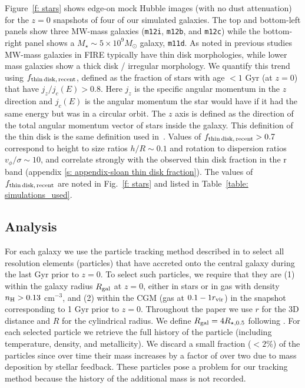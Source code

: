 \documentclass[fleqn,usenatbib]{mnras}
\newcommand{\Rvir}{r_{\rm vir}}
\begin{document}
Figure~\ref{f: stars} shows edge-on mock Hubble images (with no dust attenuation) for the $z=0$ snapshots of four of our simulated galaxies.
The top and bottom-left panels show three MW-mass galaxies (\texttt{m12i}, \texttt{m12b}, and \texttt{m12c}) while the bottom-right panel shows a $M_\star \sim 5 \times 10^9 M_\odot$ galaxy, \texttt{m11d}.
As noted in previous studies~\citep{Garrison-Kimmel2018, El-Badry2018} MW-mass galaxies in FIRE typically have thin disk morphologies, while lower mass galaxies show a thick disk / irregular morphology.
We quantify this trend using $f_{\rm thin\,disk,\,recent}$, defined as the fraction of stars with age $<1$ Gyr (at $z=0$) that have $j_z/j_c(E) > 0.8$.
Here $j_z$ is the specific angular momentum in the $z$ direction and $j_c(E)$ is the angular momentum the star would have if it had the same energy but was in a circular orbit.
The $z$ axis is defined as the direction of the total angular momentum vector of stars inside the galaxy.
This definition of the thin disk is the same definition used in~\cite{Yu2021}.
Values of $f_{\rm thin\,disk,\,recent}>0.7$ correspond to height to size ratios $h/R \sim 0.1$ and rotation to dispersion ratios $v_\phi/\sigma\sim10$, and correlate strongly with the observed thin disk fraction in the r band (appendix \ref{s: appendix-sloan thin disk fraction}).
The values of $f_{\rm thin\,disk,\,recent}$ are noted in Fig.~\ref{f: stars} and listed in Table~\ref{table: simulations_used}.

\subsection{Analysis}
\label{s: methods -- analysis}

For each galaxy we use the particle tracking method described in \cite{Hafen2019, Hafen2020} to select all resolution elements (particles) that have accreted onto the central galaxy during the last Gyr prior to $z=0$.
To select such particles, we require that they are
(1) within the galaxy radius $R_{\rm gal}$ at $z=0$, either in stars or in gas with density  $n_{\rm H} > 0.13$ cm$^{-3}$, and
(2) within the CGM (gas at $0.1 - 1 \Rvir$) in the snapshot corresponding to 1 Gyr prior to $z=0$.
Throughout the paper we use $r$ for the 3D distance and $R$ for the cylindrical radius. 
We define $R_{\rm gal} = 4 R_{\star,0.5}$ following \cite{Hafen2019, Hafen2020}.
For each selected particle we retrieve the full history of the particle (including temperature, density, and metallicity). 
We discard a small fraction ($<2\%$) of the particles since over time their mass increases by a factor of over two due to mass deposition by stellar feedback.
These particles pose a problem for our tracking method because the history of the additional mass is not recorded.
\end{document}
